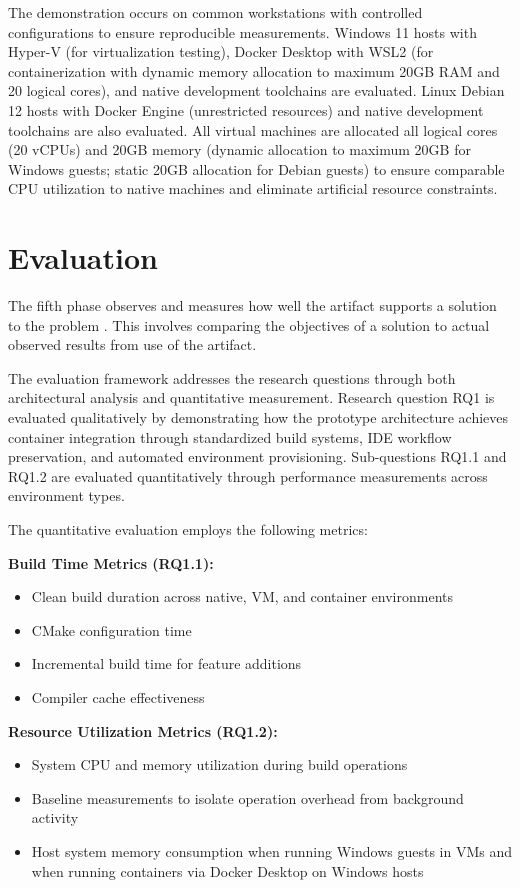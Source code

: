 The demonstration occurs on common workstations with controlled configurations to ensure reproducible measurements.
Windows 11 hosts with Hyper-V (for virtualization testing), Docker Desktop with WSL2 (for containerization with dynamic memory allocation to maximum 20GB RAM and 20 logical cores), and native development toolchains are evaluated.
Linux Debian 12 hosts with Docker Engine (unrestricted resources) and native development toolchains are also evaluated.
All virtual machines are allocated all logical cores (20 vCPUs) and 20GB memory (dynamic allocation to maximum 20GB for Windows guests; static 20GB allocation for Debian guests) to ensure comparable CPU utilization to native machines and eliminate artificial resource constraints.

\section{Evaluation}
\label{sec:methodology_evaluation}

The fifth phase observes and measures how well the artifact supports a solution to the problem \citep{peffersDesignScienceResearch2007}.
This involves comparing the objectives of a solution to actual observed results from use of the artifact.

The evaluation framework addresses the research questions through both architectural analysis and quantitative measurement.
Research question RQ1 is evaluated qualitatively by demonstrating how the prototype architecture achieves container integration through standardized build systems, IDE workflow preservation, and automated environment provisioning.
Sub-questions RQ1.1 and RQ1.2 are evaluated quantitatively through performance measurements across environment types.

The quantitative evaluation employs the following metrics:

\textbf{Build Time Metrics (RQ1.1):}
\begin{itemize}
	\item Clean build duration across native, VM, and container environments
	\item CMake configuration time
	\item Incremental build time for feature additions
	\item Compiler cache effectiveness
\end{itemize}

\newpage
\textbf{Resource Utilization Metrics (RQ1.2):}
\begin{itemize}
	\item System CPU and memory utilization during build operations
	\item Baseline measurements to isolate operation overhead from background activity
	\item Host system memory consumption when running Windows guests in VMs and when running containers via Docker Desktop on Windows hosts
\end{itemize}


